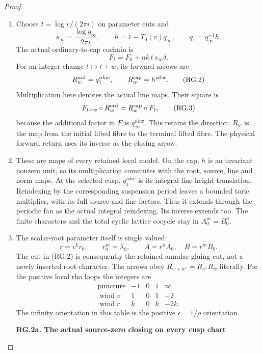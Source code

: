 \begin{proof}
\begin{enumerate}[label=\arabic*.]
\par\nobreak

\item Choose \(t=\log v/(2\pi i)\) on parameter cuts and
\[
 s_\infty=\frac{\log q_\infty}{2\pi i},\qquad
 h=1-T_0(v)q_\infty,\qquad q_1=q_\infty^{-1}h.
\]
The actual ordinary-to-cap cochain is
\[
 F_t=F_0+nk\,t\,s_\infty\delta.
\]
For an integer change \(t\mapsto t+w\), its forward arrows are
\[
 R^{\rm ord}_w=q_1^{nkw},\qquad
 R^{\rm cap}_w=h^{nkw}.                              \tag{RG.2}
\]
Multiplication here denotes the actual line maps. Their square is
\[
 F_{t+w}\circ R^{\rm ord}_w
        =R^{\rm cap}_w\circ F_t,                     \tag{RG.3}
\]
because the additional factor in \(F\) is \(q_\infty^{nkw}\).
This retains the direction: \(R_w\) is the map from the initial
lifted fibre to the terminal lifted fibre. The physical forward
return uses its inverse as the closing arrow.

\item These are maps of every retained local model. On the cap, \(h\)
is an invariant nonzero unit, so its multiplication commutes
with the root, source, line and norm maps. At the selected cusp,
\(q_1^{nkw}\) is its integral line-height translation. Reindexing
by the corresponding suspension period leaves a bounded toric
multiplier, with its full source and line factors. Thus it
extends through the periodic fan as the actual integral
reindexing. Its inverse extends too. The finite characters and
the total cyclic lattice cocycle stay in \(A_0^m=B_0^n\).

\item The scalar-root parameter itself is single valued:
\[
 r=v^k r_0,\qquad r_0^m=\lambda_0,\qquad
 A=r^nA_0,\quad B=r^mB_0.
\]
The cut in (RG.2) is consequently the retained annular gluing
cut, not a newly inserted root character. The arrows obey
\(R_{w+w'}=R_{w'}R_w\) literally. For the positive local rho
loops the integers are
\[
 \begin{array}{c|rrrr}
 \text{puncture}&-1&0&1&\infty\\ \hline
 \operatorname{wind}v&1&0&1&-2\\
 \operatorname{wind}r&k&0&k&-2k .
 \end{array}                                           \tag{RG.4}
\]
The infinity orientation in this table is the positive
\(\epsilon=1/\rho\) orientation.

\par

\medskip\noindent\textbf{RG.2a. The actual source-zero closing on every cusp chart}


\end{enumerate}
\end{proof}
